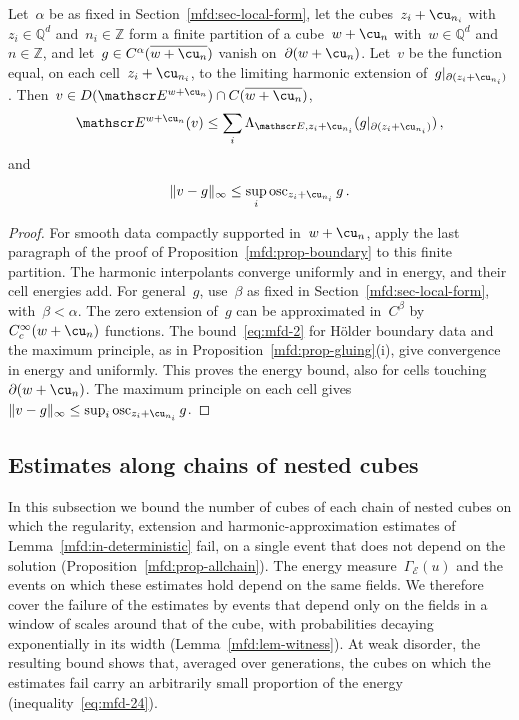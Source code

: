 \documentclass[11pt]{amsart}
\begin{document}
\begin{lemma}
\label{mfd:lem-skeleton}
Let~$\alpha$ be as fixed in Section~\ref{mfd:sec-local-form}, let the cubes~$z_i+\cu_{n_i}$ with~$z_i\in\mathbb Q^d$ and~$n_i\in\mathbb Z$ form a finite partition of a cube~$w+\cu_n$ with~$w\in\mathbb Q^d$ and~$n\in\mathbb Z$, and let~$g\in C^\alpha(\overline{w+\cu_n})$ vanish on~$\partial(w+\cu_n)$. Let~$v$ be the function equal, on each cell~$z_i+\cu_{n_i}$, to the limiting harmonic extension of~$g|_{\partial(z_i+\cu_{n_i})}$. Then~$v\in D(\mathscr E^{w+\cu_n})\cap C(\overline{w+\cu_n})$,
\begin{equation*}
	\mathscr E^{w+\cu_n}(v)\leq\sum_i\Lambda_{\mathscr E,z_i+\cu_{n_i}}(g|_{\partial(z_i+\cu_{n_i})})\,,
\end{equation*}
and
\begin{equation*}
	\|v-g\|_\infty\leq\sup_i\operatorname{osc}_{z_i+\cu_{n_i}}g\,.
\end{equation*}
\end{lemma}

\begin{proof}
For smooth data compactly supported in~$w+\cu_n$, apply the last paragraph of the proof of Proposition~\ref{mfd:prop-boundary} to this finite partition. The harmonic interpolants converge uniformly and in energy, and their cell energies add. For general~$g$, use~$\beta$ as fixed in Section~\ref{mfd:sec-local-form}, with~$\beta<\alpha$. The zero extension of~$g$ can be approximated in~$C^\beta$ by~$C_c^\infty(w+\cu_n)$ functions. The bound~\eqref{eq:mfd-2} for H\"older boundary data and the maximum principle, as in Proposition~\ref{mfd:prop-gluing}(i), give convergence in energy and uniformly. This proves the energy bound, also for cells touching~$\partial(w+\cu_n)$. The maximum principle on each cell gives~$\|v-g\|_\infty\leq\sup_i\operatorname{osc}_{z_i+\cu_{n_i}}g$.
\end{proof}

\subsection{Estimates along chains of nested cubes}
\label{mfd:sec-branches}

In this subsection we bound the number of cubes of each chain of nested cubes on which the regularity, extension and harmonic-approximation estimates of Lemma~\ref{mfd:in-deterministic} fail, on a single event that does not depend on the solution (Proposition~\ref{mfd:prop-allchain}). The energy measure~$\Gamma_{\mathscr E}(u)$ and the events on which these estimates hold depend on the same fields. We therefore cover the failure of the estimates by events that depend only on the fields in a window of scales around that of the cube, with probabilities decaying exponentially in its width (Lemma~\ref{mfd:lem-witness}). At weak disorder, the resulting bound shows that, averaged over generations, the cubes on which the estimates fail carry an arbitrarily small proportion of the energy (inequality~\eqref{eq:mfd-24}).
\end{document}
